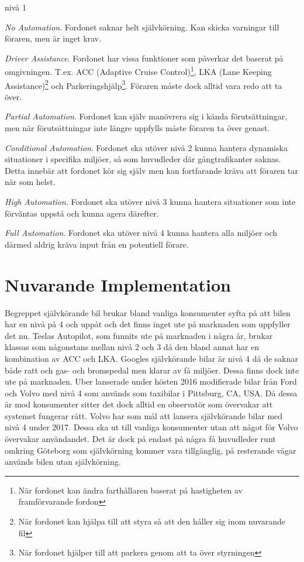 \documentclass[a4paper]{IEEEtran}
\begin{document}
\vspace{10 pt}
\begin{labeling}{nivå 1}
	\item [\textbf{nivå 0}] \emph{No Automation}. Fordonet saknar helt självkörning. Kan skicka varningar till föraren, men är inget krav.
	\item [\textbf{nivå 1}] \emph{Driver Assistance}. Fordonet har vissa funktioner som påverkar det baserat på omgivningen. T.ex. ACC (Adaptive Cruise Control)\footnote{När fordonet kan ändra farthållaren baserat på hastigheten av framförvarande fordon\cite{ACC}}, LKA (Lane Keeping Assistance)\footnote{När fordonet kan hjälpa till att styra så att den håller sig inom nuvarande fil\cite{LKA}} och Parkeringshjälp\footnote{När fordonet hjälper till att parkera genom att ta över styrningen\cite{AP}}. Föraren måste dock alltid vara redo att ta över.
	\item [\textbf{nivå 2}] \emph{Partial Automation}. Fordonet kan själv manövrera sig i kända förutsättningar, men när förutsättningar inte längre uppfylls måste föraren ta över genast.
	\item [\textbf{nivå 3}] \emph{Conditional Automation}. Fordonet ska utöver nivå 2 kunna hantera dynamiska situationer i specifika miljöer, så som huvudleder där gångtrafikanter saknas. Detta innebär att fordonet kör sig själv men kan fortfarande kräva att föraren tar när som helst.
	\item [\textbf{nivå 4}] \emph{High Automation}. Fordonet ska utöver nivå 3 kunna hantera situationer som inte förväntas uppstå och kunna agera därefter.
	\item [\textbf{nivå 5}] \emph{Full Automation}. Fordonet ska utöver nivå 4 kunna hantera alla miljöer och därmed aldrig kräva input från en potentiell förare.
\end{labeling}

\section{Nuvarande Implementation}
Begreppet självkörande bil brukar bland vanliga konsumenter syfta på att bilen har en nivå på 4 och uppåt och det finns inget ute på marknaden som uppfyller det nu.
Teslas Autopilot, som funnits ute på marknaden i några år, brukar klassas som någonstans mellan nivå 2 och 3 då den bland annat har en kombination av ACC och LKA. 
Googles självkörande bilar är nivå 4 då de saknar både ratt och gas- och bromspedal men klarar av få miljöer.
Dessa finns dock inte ute på marknaden.
Uber lanserade under hösten 2016 modifierade bilar från Ford och Volvo med nivå 4 som används som taxibilar i Pittsburg, CA, USA. Då dessa är mod konsumenter sitter det dock alltid en observatör som övervakar att systemet fungerar rätt.
Volvo har som mål att lansera självkörande bilar med nivå 4 under 2017. Dessa ska ut till vanliga konsumenter utan att något för Volvo övervakar användandet. Det är dock på endast på några få huvudleder runt omkring Göteborg som självkörning kommer vara tillgänglig, på resterande vägar används bilen utan självkörning.
\cite{UberAD,VergeAD,CWGoogleAD}
\end{document}
